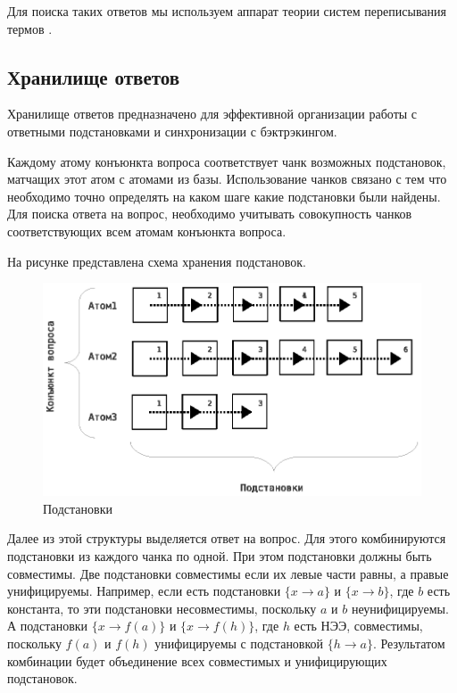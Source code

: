 Для поиска таких ответов мы используем аппарат теории систем переписывания термов \cite{Nipkow}.



\subsection{Хранилище ответов}
Хранилище ответов предназначено для эффективной организации работы с ответными подстановками и синхронизации с бэктрэкингом.

Каждому атому конъюнкта вопроса соответствует чанк возможных подстановок, матчащих этот атом с атомами из базы. Использование чанков связано с тем что необходимо точно определять на каком шаге какие подстановки были найдены. Для поиска ответа на вопрос, необходимо учитывать совокупность чанков соответствующих всем атомам конъюнкта вопроса.

На рисунке представлена схема хранения подстановок. 

\begin{figure}[h]
	\centering
	\includegraphics[width=0.6\linewidth]{pics/AnBase.eps}
	\caption{Подстановки}
	\label{fig:anbase}
\end{figure}

Далее из этой структуры выделяется ответ на вопрос. Для этого комбинируются подстановки из каждого чанка по одной. При этом подстановки должны быть совместимы. Две подстановки совместимы если их левые части равны, а правые унифицируемы. Например, если есть подстановки $\{x \rightarrow a\}$ и $\{x \rightarrow b\}$, где $b$ есть константа, то эти подстановки несовместимы, поскольку $a$ и $b$ неунифицируемы. А подстановки $\{x \rightarrow f(a)\}$ и $\{x \rightarrow f(h)\}$, где $h$ есть НЭЭ, совместимы, поскольку $f(a)$ и $f(h)$ унифицируемы с подстановкой $\{h \rightarrow a\}$. Результатом комбинации будет объединение всех совместимых и унифицирующих подстановок.

